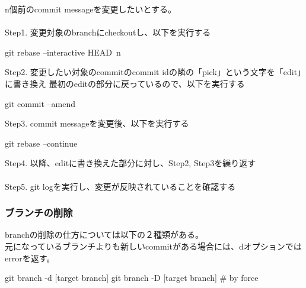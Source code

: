 \documentclass[10pt,a4j,openany,dvipdfmx]{jsarticle}
\begin{document}
\begin{tcolorbox}[skin=enhanced,
left=3mm,right=3mm,top=1mm,bottom=1mm, boxrule=1.0mm, 
title=2つ以上前のcommit messageの変更, coltitle=black, fonttitle=\bfseries, 
colback=SpringGreen!5!white,colframe=SpringGreen!70]
n個前のcommit messageを変更したいとする。\\
\\
Step1. 変更対象のbranchにcheckoutし、以下を実行する
\begin{commandshell}
git rebase --interactive HEAD~n
\end{commandshell}

Step2. 変更したい対象のcommitのcommit idの隣の「pick」という文字を「edit」に書き換え
最初のeditの部分に戻っているので、以下を実行する
\begin{commandshell}
git commit --amend
\end{commandshell}

Step3. commit messageを変更後、以下を実行する
\begin{commandshell}
git rebase --continue
\end{commandshell}

Step4. 以降、editに書き換えた部分に対し、Step2, Step3を繰り返す\\
\\
Step5. git logを実行し、変更が反映されていることを確認する
\end{tcolorbox}


\subsubsection{ブランチの削除} %
\label{ssub:ブランチの削除}

branchの削除の仕方については以下の２種類がある。\\
元になっているブランチよりも新しいcommitがある場合には、dオプションではerrorを返す。
\begin{commandshell}
git branch -d [target branch]
git branch -D [target branch]   # by force
\end{commandshell}





\end{document}
